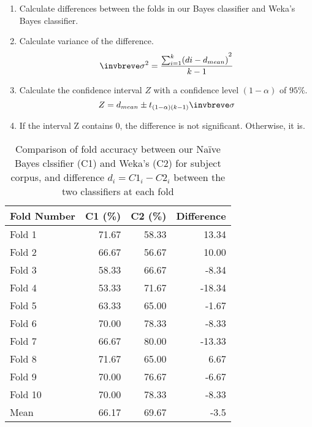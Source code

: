 \documentclass[10pt, a4paper]{article}
\begin{document}
\begin{enumerate}
\item Calculate differences between the folds in our Bayes classifier and Weka's Bayes classifier.
\item Calculate variance of the difference.
$$ \invbreve\sigma ^{2} = \frac{ {\sum\nolimits_{i=1}^k (di-d_{mean})}^2 }{k-1} $$
\item Calculate the confidence interval $Z$ with a confidence level $(1-\alpha)$ of $95\%$.
$$ Z = d_{mean} \pm t_{(1-\alpha)(k-1)} \invbreve\sigma $$
\item If the interval Z contains 0, the difference is not significant. Otherwise, it is.
\end{enumerate}

\begin{table}[H]
\centering
\caption{Comparison of fold accuracy between our Na\"ive Bayes clssifier (C1) and Weka's (C2) for subject corpus, and difference $d_{i} = C1_{i} - C2_{i}$ between the two classifiers at each fold}
\begin{tabular}{@{}lrrr@{}}
\toprule
\textbf{Fold Number} & \textbf{C1 (\%)} & \textbf{C2 (\%)}
	& \textbf{Difference} \\
\midrule
Fold 1 & 71.67 & 58.33 & 13.34 \\
Fold 2 & 66.67 & 56.67 & 10.00 \\
Fold 3 & 58.33 & 66.67 & -8.34 \\
Fold 4 & 53.33 & 71.67 & -18.34 \\
Fold 5 & 63.33 & 65.00 & -1.67 \\
Fold 6 & 70.00 & 78.33 & -8.33 \\
Fold 7 & 66.67 & 80.00 & -13.33 \\
Fold 8 & 71.67 & 65.00 & 6.67 \\
Fold 9 & 70.00 & 76.67 & -6.67 \\
Fold 10 & 70.00 & 78.33 & -8.33 \\
\bottomrule
Mean & 66.17 & 69.67 & -3.5 \\
\bottomrule
\end{tabular}
\label{table:diffsubj}
\end{table}
\end{document}
